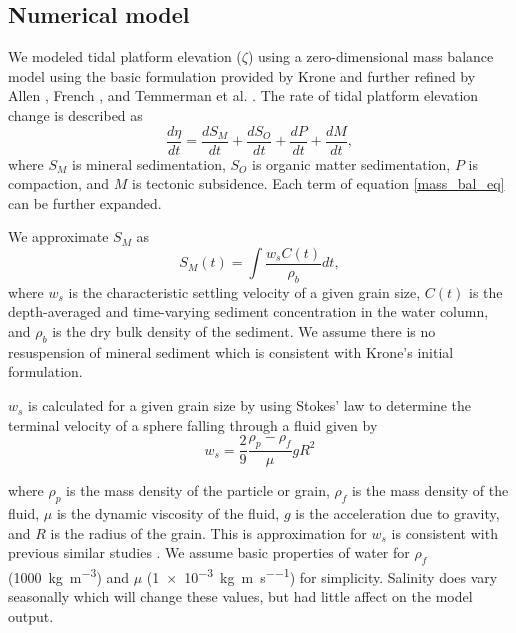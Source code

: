 \documentclass[9pt,twocolumn,twoside,lineno]{pnas-new}
\begin{document}

\subsection*{Numerical model}

We modeled tidal platform elevation ($\zeta$) using a zero-dimensional mass balance model using the basic formulation provided by Krone \cite{kroneMethodSimulatingMarsh1987} and further refined by Allen \cite{allenSaltmarshGrowthStratification1990}, French \cite{frenchNumericalSimulationVertical1993}, and Temmerman et al. \cite{temmermanModellingLongtermTidal2003,temmermanModellingEstuarineVariations2004}. The rate of tidal platform elevation change is described as
\begin{equation}\label{mass_bal_eq}
	\frac{d \eta}{d t} = \frac{d S_M}{d t} + \frac{d S_O}{d t} + \frac{d P}{d t} + \frac{d M}{d t},
\end{equation}
where $S_M$ is mineral sedimentation, $S_O$ is organic matter sedimentation, $P$ is compaction, and $M$ is tectonic subsidence. Each term of equation \ref{mass_bal_eq} can be further expanded.

We approximate $S_M$ as
\begin{equation}\label{min_sed_eq}
	S_M(t) = \int{\frac{w_{s}C(t)}{\rho_b}dt},
\end{equation}
where $w_s$ is the characteristic settling velocity of a given grain size, $C(t)$ is the depth-averaged and time-varying sediment concentration in the water column, and $\rho_b$ is the dry bulk density of the sediment. We assume there is no resuspension of mineral sediment which is consistent with Krone's \cite{kroneMethodSimulatingMarsh1987} initial formulation.

$w_s$ is calculated for a given grain size by using Stokes' law to determine the terminal velocity of a sphere falling through a fluid given by
\begin{equation}\label{ws_eq}
	w_s =  \frac{2}{9}\frac{\rho_p - \rho_f}{\mu}gR^2
\end{equation}

where $\rho_p$ is the mass density of the particle or grain, $\rho_f$ is the mass density of the fluid, $\mu$ is the dynamic viscosity of the fluid, $g$ is the acceleration due to gravity, and $R$ is the radius of the grain. This is approximation for $w_s$ is consistent with previous similar studies \cite{allenSaltmarshGrowthStratification1990,temmermanModellingLongtermTidal2003,temmermanModellingEstuarineVariations2004}. We assume basic properties of water for $\rho_f$ (\SI{1000}{\kilo\gram\per\cubic\meter}) and $\mu$ (\SI{1e-3}{\kilo\gram\per\meter\per\second}) for simplicity. Salinity does vary seasonally which will change these values, but had little affect on the model output.
\end{document}
